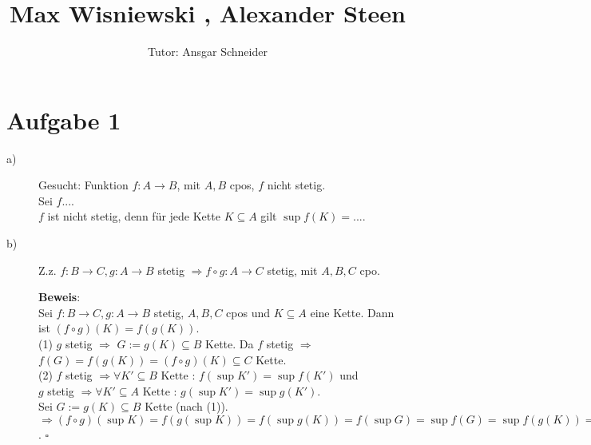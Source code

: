 \documentclass[11pt,a4paper,ngerman]{article}
\author{Tutor: Ansgar Schneider}
\date{}
\title{Max Wisniewski , Alexander Steen}
\begin{document}

\maketitle
\thispagestyle{fancy}
\newcommand{\A}{\mathbb{A}}


\section*{Aufgabe 1} 
\begin{description}
\item[a)] Gesucht: Funktion $f : A \to B$, mit $A,B$ cpos, $f$ nicht stetig. \\

Sei $f $....\\
$f$ ist nicht stetig, denn für jede Kette $K \subseteq A$ gilt $\sup f(K) = ... $.
\item[b)] Z.z. $f: B \to C, g: A \to B$ stetig $\Rightarrow f \circ g: A \to C$ stetig, mit $A,B,C$ cpo. 

\textbf{Beweis}:\\
Sei $f: B \to C, g: A \to B$ stetig, $A,B,C$ cpos und $K \subseteq A$ eine Kette. Dann ist $(f \circ g)(K) = f(g(K))$. \\
(1) $g$ stetig $\Rightarrow$ $G := g(K) \subseteq B$ Kette. Da $f$ stetig $\Rightarrow$ $f(G) = f(g(K)) = (f \circ g)(K) \subseteq C$ Kette.\\

(2) $f$ stetig $\Rightarrow \forall K' \subseteq  B \text{ Kette }: \, f(\sup K') = \sup f(K')$ und\\
$g$ stetig $\Rightarrow \forall K' \subseteq  A \text{ Kette }: \, g(\sup K') = \sup g(K')$.\\
Sei $G := g(K) \subseteq B $ Kette (nach (1)).\\
$\Rightarrow (f \circ g)(\sup K) = f(g(\sup K)) =f(\sup g(K)) = f(\sup G) = \sup f(G) = \sup f(g(K)) = \sup (f \circ g)(K)$.
\mbox{} \hfill $\square$
\end{description}

\end{document}
